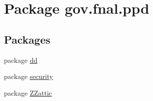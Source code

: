 \hypertarget{namespacegov_1_1fnal_1_1ppd}{\section{Package gov.\-fnal.\-ppd}
\label{namespacegov_1_1fnal_1_1ppd}
}
\subsection*{Packages}
\begin{DoxyCompactItemize}
\item 
package \hyperlink{namespacegov_1_1fnal_1_1ppd_1_1dd}{dd}
\item 
package \hyperlink{namespacegov_1_1fnal_1_1ppd_1_1security}{security}
\item 
package \hyperlink{namespacegov_1_1fnal_1_1ppd_1_1ZZattic}{Z\-Zattic}
\end{DoxyCompactItemize}

